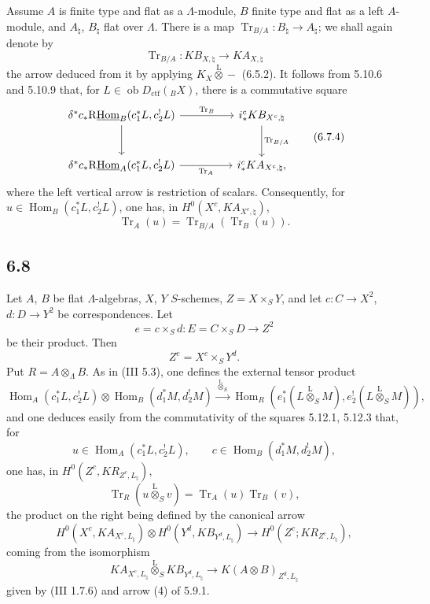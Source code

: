 \documentclass[11pt]{article}
\DeclareMathOperator{\Hom}{Hom}
\providecommand{\Tr}{\operatorname{Tr}}
\providecommand{\Tr}{\operatorname{Tr}}
\providecommand{\lten}{\overset{\mathrm L}{\otimes}}
\providecommand{\Ob}{\operatorname{ob}}
\providecommand{\Tr}{\operatorname{Tr}}
\providecommand{\Hom}{\operatorname{Hom}}
\providecommand{\lten}{\overset{\mathrm L}{\otimes}}
\providecommand{\lten}{\overset{\mathrm L}{\otimes}}
\providecommand{\Ob}{\operatorname{ob}}
\providecommand{\Tr}{\operatorname{Tr}}
\providecommand{\lten}{\overset{\mathrm L}{\otimes}}
\providecommand{\lten}{\overset{\mathrm L}{\otimes}}
\providecommand{\Ob}{\operatorname{Ob}}
\providecommand{\lten}{\overset{\mathrm L}{\otimes}}
\providecommand{\Hom}{\operatorname{Hom}}
\providecommand{\Tr}{\operatorname{Tr}}
\providecommand{\Ob}{\operatorname{ob}}
\providecommand{\Ob}{\operatorname{Ob}}
\providecommand{\lten}{\overset{\mathrm L}{\otimes}}
\begin{document}
Assume $A$ is finite type and flat as a $\Lambda$-module, $B$ finite type and flat as a left $A$-module, and $A_{\natural}$, $B_{\natural}$ flat over $\Lambda$. There is a map $\Tr_{B/A}:B_{\natural}\to A_{\natural}$; we shall again denote by
\begin{equation}
\Tr_{B/A}:KB_{X,\natural}\longrightarrow KA_{X,\natural}
\tag{6.7.3}
\end{equation}
the arrow deduced from it by applying $K_X\lten -$ (6.5.2). It follows from 5.10.6 and 5.10.9 that, for $L\in\Ob D_{\mathrm{ctf}}({}_BX)$, there is a commutative square
\begin{equation}
\begin{tikzcd}[column sep=huge,row sep=large]
\delta^*c_*\mathrm{R}\underline{\mathrm{Hom}}_B(c_1^*L,c_2^!L) \arrow[r,"\Tr_B"] \arrow[d]
& i_*^cKB_{X^c,\natural} \arrow[d,"\Tr_{B/A}"]\\
\delta^*c_*\mathrm{R}\underline{\mathrm{Hom}}_A(c_1^*L,c_2^!L) \arrow[r,"\Tr_A"']
& i_*^cKA_{X^c,\natural},
\end{tikzcd}
\tag{6.7.4}
\end{equation}
where the left vertical arrow is restriction of scalars. Consequently, for $u\in\Hom_B(c_1^*L,c_2^!L)$, one has, in $H^0(X^c,KA_{X^c,\natural})$,
\begin{equation}
\Tr_A(u)=\Tr_{B/A}(\Tr_B(u)).
\tag{6.7.5}
\end{equation}

\subsection*{6.8}
Let $A$, $B$ be flat $\Lambda$-algebras, $X$, $Y$ $S$-schemes, $Z=X\times_SY$, and let $c:C\to X^2$, $d:D\to Y^2$ be correspondences. Let
\[
e=c\times_Sd:E=C\times_SD\longrightarrow Z^2
\]
be their product. Then
\[
Z^e=X^c\times_SY^d.
\]
Put $R=A\otimes_{\Lambda}B$. As in (III 5.3), one defines the external tensor product
\begin{equation}
\Hom_A(c_1^*L,c_2^!L)\otimes \Hom_B(d_1^*M,d_2^!M)
\xrightarrow{\ \lten_S\ }
\Hom_R(e_1^*(L\lten_SM),e_2^!(L\lten_SM)),
\tag{6.8.1}
\end{equation}
and one deduces easily from the commutativity of the squares 5.12.1, 5.12.3 that, for
\[
u\in\Hom_A(c_1^*L,c_2^!L),\qquad c\in\Hom_B(d_1^*M,d_2^!M),
\]
one has, in $H^0(Z^c,KR_{Z^c,L_{\natural}})$,
\begin{equation}
\Tr_R(u\lten_Sv)=\Tr_A(u)\Tr_B(v),
\tag{6.8.2}
\end{equation}
the product on the right being defined by the canonical arrow
\begin{equation}
H^0(X^c,KA_{X^c,L_{\natural}})\otimes
H^0(Y^d,KB_{Y^d,L_{\natural}})
\longrightarrow
H^0(Z^c;KR_{Z^c,L_{\natural}}),
\tag{6.8.3}
\end{equation}
coming from the isomorphism
\[
KA_{X^c,L_{\natural}}\lten_S KB_{Y^d,L_{\natural}}\longrightarrow K(A\otimes B)_{Z^d,L_{\natural}}
\]
given by (III 1.7.6) and arrow (4) of 5.9.1.
\end{document}
